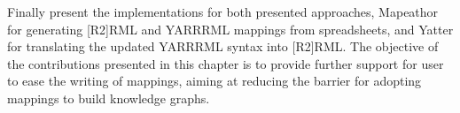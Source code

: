 Finally present the implementations for both presented approaches, Mapeathor for generating [R2]RML and YARRRML mappings from spreadsheets, and Yatter for translating the updated YARRRML syntax into [R2]RML. The objective of the contributions presented in this chapter is to provide further support for user to ease the writing of mappings, aiming at reducing the barrier for adopting mappings to build knowledge graphs. 

